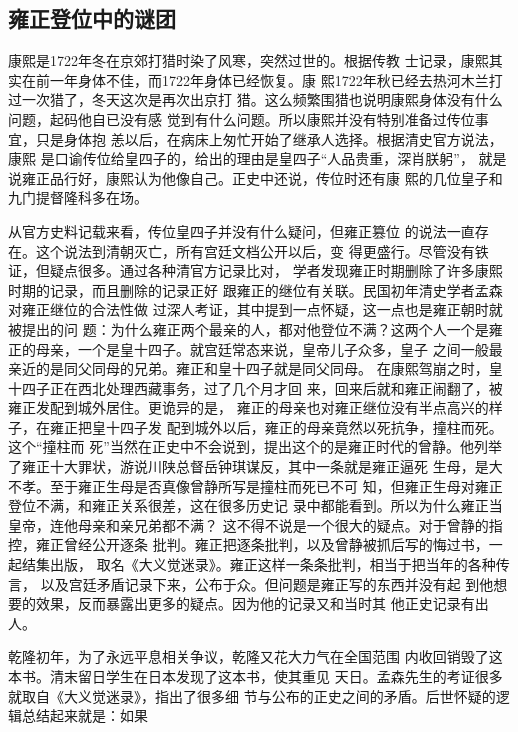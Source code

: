 \subsection{雍正登位中的谜团}
\par
康熙是1722年冬在京郊打猎时染了风寒，突然过世的。根据传教%
士记录，康熙其实在前一年身体不佳，而1722年身体已经恢复。康%
熙1722年秋已经去热河木兰打过一次猎了，冬天这次是再次出京打%
猎。这么频繁围猎也说明康熙身体没有什么问题，起码他自已没有感%
觉到有什么问题。所以康熙并没有特别准备过传位事宜，只是身体抱%
恙以后，在病床上匆忙开始了继承人选择。根据清史官方说法，康熙%
是口谕传位给皇四子的，给出的理由是皇四子“人品贵重，深肖朕躬”，%
就是说雍正品行好，康熙认为他像自己。正史中还说，传位时还有康%
熙的几位皇子和九门提督隆科多在场。%
\par
从官方史料记载来看，传位皇四子并没有什么疑问，但雍正篡位%
的说法一直存在。这个说法到清朝灭亡，所有宫廷文档公开以后，变%
得更盛行。尽管没有铁证，但疑点很多。通过各种清官方记录比对，%
学者发现雍正时期删除了许多康熙时期的记录，而且删除的记录正好%
跟雍正的继位有关联。民国初年清史学者孟森对雍正继位的合法性做%
过深人考证，其中提到一点怀疑，这一点也是雍正朝时就被提出的问%
题：为什么雍正两个最亲的人，都对他登位不满？这两个人一个是雍%
正的母亲，一个是皇十四子。就宫廷常态来说，皇帝儿子众多，皇子%
之间一般最亲近的是同父同母的兄弟。雍正和皇十四子就是同父同母。%
在康熙驾崩之时，皇十四子正在西北处理西藏事务，过了几个月才回%
来，回来后就和雍正闹翻了，被雍正发配到城外居住。更诡异的是，%
雍正的母亲也对雍正继位没有半点高兴的样子，在雍正把皇十四子发%
配到城外以后，雍正的母亲竟然以死抗争，撞柱而死。这个“撞柱而%
死”当然在正史中不会说到，提出这个的是雍正时代的曾静。他列举%
了雍正十大罪状，游说川陕总督岳钟琪谋反，其中一条就是雍正逼死%
生母，是大不孝。至于雍正生母是否真像曾静所写是撞柱而死已不可%
知，但雍正生母对雍正登位不满，和雍正关系很差，这在很多历史记%
录中都能看到。所以为什么雍正当皇帝，连他母亲和亲兄弟都不满？%
这不得不说是一个很大的疑点。对于曾静的指控，雍正曾经公开逐条%
批判。雍正把逐条批判，以及曾静被抓后写的悔过书，一起结集出版，%
取名《大义觉迷录》。雍正这样一条条批判，相当于把当年的各种传言，%
以及宫廷矛盾记录下来，公布于众。但问题是雍正写的东西并没有起%
到他想要的效果，反而暴露出更多的疑点。因为他的记录又和当时其%
他正史记录有出人。%
\par
乾隆初年，为了永远平息相关争议，乾隆又花大力气在全国范围%
内收回销毁了这本书。清末留日学生在日本发现了这本书，使其重见%
天日。孟森先生的考证很多就取自《大义觉迷录》，指出了很多细%
节与公布的正史之间的矛盾。后世怀疑的逻辑总结起来就是：如果%
